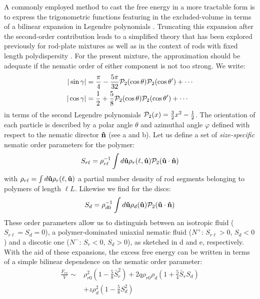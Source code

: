 A commonly employed method to cast the free energy in a more tractable form is to express the trigonometric functions featuring in the excluded-volume  in terms of a bilinear expansion in Legendre polynomials \cite{lakatos,kayser,lekkerkerker84}. Truncating this expansion after the second-order contribution leads to a simplified theory that has been explored previously for rod-plate mixtures \cite{stroobants1984,jacksonbiax} as well as in the context of  rods with fixed length polydispersity \cite{sollichonsagerP2}. For the present mixture, the approximation should be adequate if the nematic order of either component is not too strong. We  write:
\begin{align}
| \sin \gamma | &= \frac{\pi}{4} - \frac{5 \pi }{32} {\mathcal P}_{2}(\cos \theta) {\mathcal P}_{2}(\cos \theta^{\prime}) + \cdots \nonumber \\
| \cos \gamma | &= \frac{1}{2} + \frac{5 }{8} {\mathcal P}_{2}(\cos \theta) {\mathcal P}_{2}(\cos \theta^{\prime}) + \cdots
\label{p2expansion}
 \end{align}
in terms of the second Legendre polynomials ${\mathcal P}_{2}(x) = \frac{3}{2} x^{2} - \frac{1}{2}$. The  orientation of each particle is described by a polar angle $\theta$ and azimuthal angle $\varphi$ defined with respect to the nematic director ${\bf \hat{n}}$ (see a and b). Let us define a set of  {\em size-specific} nematic order parameters for the polymer:
\begin{align}
S_{r \ell} = \rho_{r \ell}^{-1} \int d {\bf \hat{u}} \rho_{r}(\ell, {\bf \hat{u}}) {\mathcal P}_{2} ({\bf \hat{u}} \cdot {\bf \hat{n}}) 
\label{sr} 
\end{align}
with $\rho_{r \ell } = \int d {\bf \hat{u}} \rho_{r} (\ell, {\bf \hat{u}})$ a partial number density of rod segments belonging to polymers of length $\ell L$. Likewise we find for the discs:
\begin{align}
S_{d} = \rho_{d0}^{-1} \int d {\bf \hat{u}} \rho_{d}( {\bf \hat{u}}) {\mathcal P}_{2} ({\bf \hat{u}} \cdot {\bf \hat{n}}) 
\end{align}
These order parameters allow us to distinguish between an isotropic fluid ($S_{r \ell}=S_{d}=0$), a polymer-dominated uniaxial nematic fluid ($N^{+}$: $S_{r \ell} > 0$, $S_{d} <0$) and a discotic one ($N^{-}$: $S_{r} < 0$, $S_{d} >0$), as sketched in d and e, respectively.  With the aid of these expansions, the excess free energy can be written in terms of a simple bilinear dependence on the nematic order parameter:
\begin{align}
 \frac{F_{ex}}{ V}   \sim & \rho_{r0}^{2}   \left ( 1 - \frac{5}{8}  \bar{S}_{r }^{2} \right ) +  2 q \rho_{r 0} \rho_{d}   \left ( 1 + \frac{5}{4} \bar{S}_{r} S_{d}   \right ) \nonumber \\
& + z \rho_{d}^{2}  \left ( 1 - \frac{5}{8} S_{d}^{2}  \right ) 
\label{fexsim}
 \end{align}
